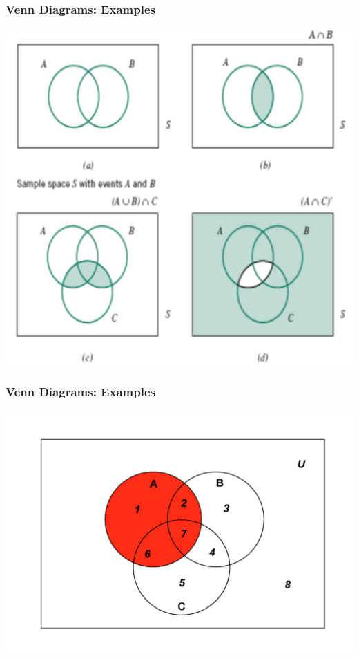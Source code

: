 \documentclass[compress]{beamer}
\begin{document}
\begin{frame}\frametitle{Venn Diagrams: Examples}
  \begin{center}
 \includegraphics[scale=.32]{figs/VennDiagram1.png}
 \end{center} 
\end{frame}



\begin{frame}\frametitle{Venn Diagrams: Examples}
  \begin{center}
 \includegraphics[scale=.26]{figs/VennDiagram2.png}
 \end{center} 
\end{frame}
\end{document}
